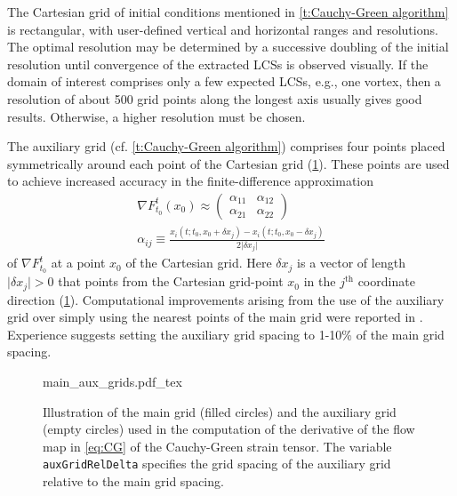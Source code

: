 \documentclass[5p]{elsarticle}
\begin{document}
The Cartesian grid of initial conditions mentioned in \cref{t:Cauchy-Green algorithm} is rectangular, with user-defined vertical and horizontal ranges and resolutions. The optimal resolution may be determined by a successive doubling of the initial resolution until convergence of the extracted LCSs is observed visually. If the domain of interest comprises only a few expected LCSs, e.g., one vortex, then a resolution of about 500 grid points along the longest axis usually gives good results. Otherwise, a higher resolution must be chosen.

The auxiliary grid (cf. \cref{t:Cauchy-Green algorithm}) comprises four points placed symmetrically around each point of the Cartesian grid (\cref{f:main and auxiliary grids}). These points are used to achieve increased accuracy in the finite-difference approximation
\begin{gather*}
\nabla F_{t_0}^t(x_0) \approx
\left(\begin{array}{cc}
\alpha_{11} & \alpha_{12}
\\
\alpha_{21} & \alpha_{22}
\end{array}\right)
\\
\alpha_{ij} \equiv \frac{x_i(t;t_0,x_0+\delta x_j) - x_i(t;t_0,x_0-\delta x_j)}{2\vert\delta x_j\vert}
\end{gather*}
of $\nabla F_{t_0}^t$ at a point $x_0$ of the Cartesian grid. Here $\delta x_j$ is a vector of length $\vert\delta x_j\vert > 0$ that points from the Cartesian grid-point $x_0$ in the $j^\text{th}$ coordinate direction (\cref{f:main and auxiliary grids}). Computational improvements arising from the use of the auxiliary grid over simply using the nearest points of the main grid were reported in \citet{farazmand12:_comput_lagran}. Experience suggests setting the auxiliary grid spacing to 1-10\% of the main grid spacing.

\begin{figure}
\begin{center}
\def\svgwidth{.325\textwidth}
{main_aux_grids.pdf_tex}
\end{center}
\caption{Illustration of the main grid (filled circles) and the auxiliary grid (empty circles) used in the computation of the derivative of the flow map in \cref{eq:CG} of the Cauchy-Green strain tensor. The variable \lstinline!auxGridRelDelta! specifies the grid spacing of the auxiliary grid relative to the main grid spacing.}
\label{f:main and auxiliary grids}
\end{figure}
\end{document}
